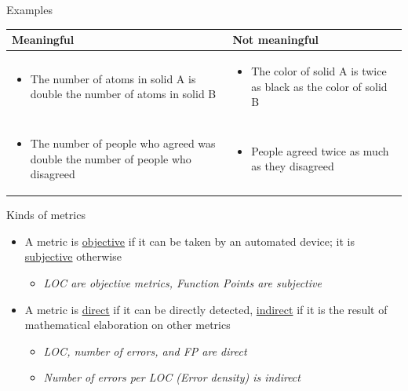 \documentclass{beamer}
\begin{document}
\begin{frame}{\centerline{Examples}}

\begin{table}[H]
\begin{tabulary}{\textwidth}{m{5.5cm} | m{5.5cm}}
\textbf{Meaningful} & 
\textbf{Not meaningful}  \\ \hline

\begin{itemize}    
\item The number of atoms in solid A is double the number of atoms in solid B
\end{itemize} &
\begin{itemize}    
\item The color of solid A is twice as black as the color of solid B
\end{itemize} \\ \hline

\begin{itemize}    
\item The number of people who agreed was double the number of people who disagreed
\end{itemize} &
\begin{itemize}    
\item People agreed twice as much as they disagreed
\end{itemize} \\ \hline

\end{tabulary}
\end{table}

\end{frame}

\begin{frame}{\centerline{Kinds of metrics}}

\begin{itemize}    
\item A metric is \underline{objective} if it can be taken by an automated device; it is \underline{subjective} otherwise
\begin{itemize}
    \item \textit{LOC are objective metrics, Function Points are subjective}
\end{itemize}
\item A metric is \underline{direct} if it can be directly detected, \underline{indirect} if it is the result of mathematical elaboration on other metrics
\begin{itemize}
    \item \textit{LOC, number of errors, and FP are direct}
    \item \textit{Number of errors per LOC (Error density) is indirect}
\end{itemize}
\end{itemize}
\end{frame}
\end{document}
